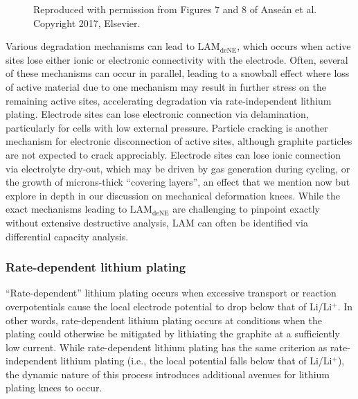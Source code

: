 \documentclass[journal=jpclcd,manuscript=article]{achemso}
\begin{document}
\begin{figure}[p]
{    Reproduced with permission from Figures 7 and 8 of Anse\'an et al.\cite{ansean_operando_2017} Copyright 2017, Elsevier.} 
    \label{fig:thermo_plating}
\end{figure}

Various degradation mechanisms can lead to $\mathrm{LAM_{deNE}}$, which occurs when active sites lose either ionic or electronic connectivity with the electrode.
Often, several of these mechanisms can occur in parallel, leading to a snowball effect where loss of active material due to one mechanism may result in further stress on the remaining active sites, accelerating degradation via rate-independent lithium plating.
Electrode sites can lose electronic connection via delamination\cite{liu_aging_2010, cannarella_stress_2014, somerville_effect_2016, willenberg_high-precision_2020}, particularly for cells with low external pressure\cite{cannarella_stress_2014}. Particle cracking is another mechanism for electronic disconnection of active sites, although graphite particles are not expected to crack appreciably\cite{takahashi_examination_2015}{}.
Electrode sites can lose ionic connection via electrolyte dry-out, which may be driven by gas generation during cycling\cite{mao_calendar_2017, kupper_end--life_2018}{}, or the growth of microns-thick ``covering layers'', an effect that we mention now but explore in depth in our discussion on mechanical deformation knees.
While the exact mechanisms leading to $\mathrm{LAM_{deNE}}$ are challenging to pinpoint exactly without extensive destructive analysis, LAM can often be identified via differential capacity analysis.\cite{ansean_operando_2017, dubarry_durability_2018, baure_synthetic_2019, dubarry_big_2020}

\subsubsection{Rate-dependent lithium plating}

``Rate-dependent'' lithium plating occurs when excessive transport or reaction overpotentials cause the local electrode potential to drop below that of Li/Li$\mathrm{^+}$.
In other words, rate-dependent lithium plating occurs at conditions when the plating could otherwise be mitigated by lithiating the graphite at a sufficiently low current.
While rate-dependent lithium plating has the same criterion as rate-independent lithium plating (i.e., the local potential falls below that of Li/Li$^+$), the dynamic nature of this process introduces additional avenues for lithium plating knees to occur.
\end{document}
